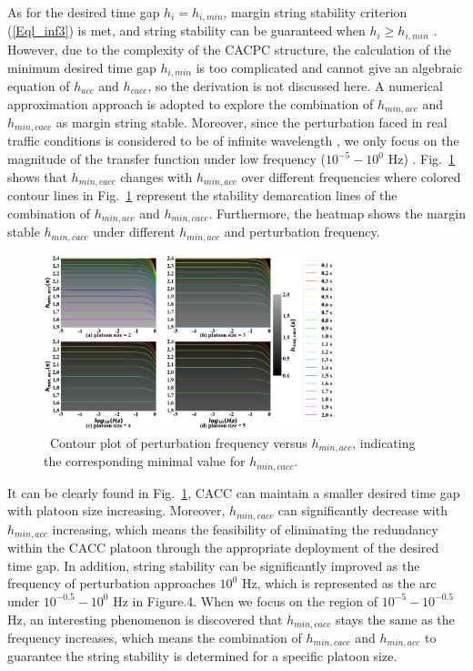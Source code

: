 \documentclass[journal]{IEEEtran}
\begin{document}
As for the desired time gap $h_i=h_{i,min}$, margin string stability criterion (\ref{Eql_inf3}) is met, and string stability can be guaranteed when $h_i\ge h_{i,min}$  \citep{naus2010string}. However, due to the complexity of the CACPC structure, the calculation of the minimum desired time gap $h_{i,min}$ is too complicated and cannot give an algebraic equation of $h_{acc}$ and $h_{cacc}$, so the derivation is not discussed here. A numerical approximation approach is adopted to explore the combination of $h_{min,acc}$ and $h_{min,cacc}$ as margin string stable. Moreover, since the perturbation faced in real traffic conditions is considered to be of infinite wavelength \citep{bian2019reducing,xiao2011practical}, we only focus on the magnitude of the transfer function under low frequency ($10^{-5} - 10^0$ Hz) \citep{Oncu2014}. Fig.~\ref{fig4} shows that $h_{min,cacc}$ changes with $h_{min,acc}$ over different frequencies where colored contour lines in Fig.~\ref{fig4} represent the stability demarcation lines of the combination of $h_{min,acc}$ and  $h_{min,cacc}$. Furthermore, the heatmap shows the margin stable $h_{min,cacc}$ under different $h_{min,acc}$ and perturbation frequency.

\begin{figure}
  \centering
  \includegraphics[width=8.5cm]{figs/fig4.png}
  \caption{~Contour plot of perturbation frequency versus $h_{min,acc}$, indicating the corresponding minimal value for $h_{min,cacc}$.}
  \label{fig4}
\end{figure}

It can be clearly found in Fig.~\ref{fig4}, CACC can maintain a smaller desired time gap with platoon size increasing. Moreover, $h_{min,cacc}$ can significantly decrease with $h_{min,acc}$ increasing, which means the feasibility of eliminating the redundancy within the CACC platoon through the appropriate deployment of the desired time gap. In addition, string stability can be significantly improved as the frequency of perturbation approaches $10^0$ Hz, which is represented as the arc under $10^{-0.5} - 10^0$ Hz in Figure.4. When we focus on the region of $10^{-5} - 10^{-0.5}$ Hz, an interesting phenomenon is discovered that $h_{min,cacc}$ stays the same as the frequency increases, which means the combination of $h_{min,cacc}$ and $h_{min,acc}$ to guarantee the string stability is determined for a specific platoon size.
\end{document}
